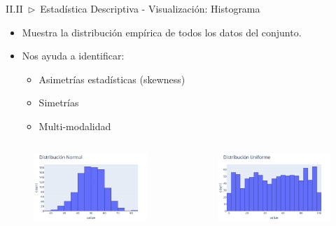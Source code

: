 \documentclass[xcolor=dvipsnames]{beamer}
\begin{document}
    \begin{frame}{II.II~$\rhd$~Estadística Descriptiva - Visualización: Histograma}
        \begin{itemize}
            \item Muestra la distribución empírica de todos los datos del conjunto.
            \item Nos ayuda a identificar:
            \begin{itemize}
                \item Asimetrías estadísticas (skewness)
                \item Simetrías
                \item Multi-modalidad
            \end{itemize}
        \end{itemize}
        \vspace{5mm}
        \begin{columns}
                \begin{figure}
                \centering
                \includegraphics[width=\textwidth]{imgs/plots/histplot_01.png}
                \end{figure}
                \begin{figure}
                \centering
                \includegraphics[width=\textwidth]{imgs/plots/histplot_02.png}
                \end{figure}
        \end{columns}
    \end{frame}
\end{document}
